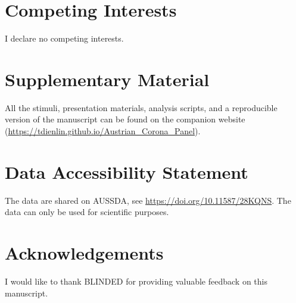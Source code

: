 \documentclass[
  man,floatsintext]{apa7}
\begin{document}
\hypertarget{competing-interests}{%
\section{Competing Interests}\label{competing-interests}}

I declare no competing interests.

\hypertarget{supplementary-material}{%
\section{Supplementary Material}\label{supplementary-material}}

All the stimuli, presentation materials, analysis scripts, and a reproducible version of the manuscript can be found on the companion website (\url{https://tdienlin.github.io/Austrian_Corona_Panel}).

\hypertarget{data-accessibility-statement}{%
\section{Data Accessibility Statement}\label{data-accessibility-statement}}

The data are shared on AUSSDA, see \url{https://doi.org/10.11587/28KQNS}.
The data can only be used for scientific purposes.

\hypertarget{acknowledgements}{%
\section{Acknowledgements}\label{acknowledgements}}

I would like to thank BLINDED for providing valuable feedback on this manuscript.
\end{document}
